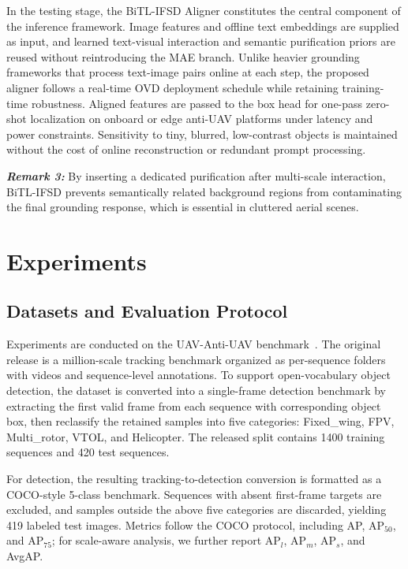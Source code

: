 \documentclass[letterpaper, 10 pt, conference]{ieeeconf}  %
\begin{document}
In the testing stage, the BiTL-IFSD Aligner constitutes the central component of the inference framework. Image features and offline text embeddings are supplied as input, and learned text-visual interaction and semantic purification priors are reused without reintroducing the MAE branch. Unlike heavier grounding frameworks that process text-image pairs online at each step, the proposed aligner follows a real-time OVD deployment schedule while retaining training-time robustness. Aligned features are passed to the box head for one-pass zero-shot localization on onboard or edge anti-UAV platforms under latency and power constraints. Sensitivity to tiny, blurred, low-contrast objects is maintained without the cost of online reconstruction or redundant prompt processing.

\noindent\textbf{\textit{Remark 3:}} By inserting a dedicated purification after multi-scale interaction, BiTL-IFSD prevents semantically related background regions from contaminating the final grounding response, which is essential in cluttered aerial scenes.

\section{Experiments}
\label{sec:experiments}

\subsection{Datasets and Evaluation Protocol}
\label{subsec:datasets-protocol}

Experiments are conducted on the UAV-Anti-UAV benchmark~\cite{zhang2025uavantiuav}. The original release is a million-scale tracking benchmark organized as per-sequence folders with videos and sequence-level annotations. To support open-vocabulary object detection, the dataset is converted into a single-frame detection benchmark by extracting the first valid frame from each sequence with corresponding object box, then reclassify the retained samples into five categories: Fixed\_wing, FPV, Multi\_rotor, VTOL, and Helicopter. The released split contains 1400 training sequences and 420 test sequences.

For detection, the resulting tracking-to-detection conversion is formatted as a COCO-style 5-class benchmark. Sequences with absent first-frame targets are excluded, and samples outside the above five categories are discarded, yielding 419 labeled test images. Metrics follow the COCO protocol, including AP, AP$_{50}$, and AP$_{75}$; for scale-aware analysis, we further report AP$_l$, AP$_m$, AP$_s$, and AvgAP.
\end{document}
